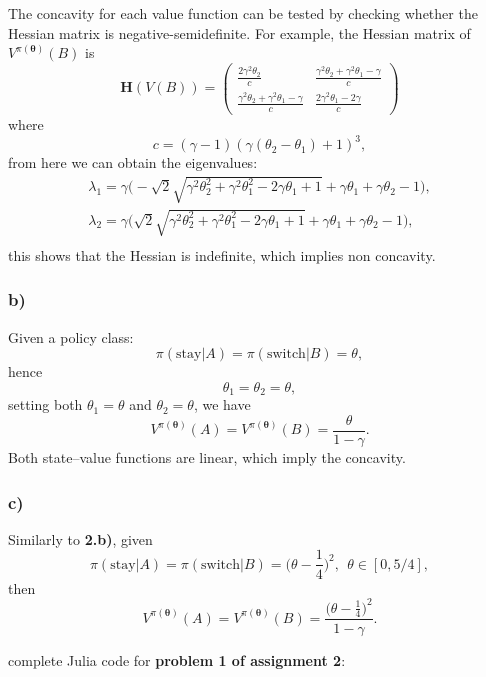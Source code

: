 \documentclass[12pt]{article}
\begin{document}
The concavity for each value function can be tested by checking whether the Hessian matrix is negative-semidefinite.
For example, the Hessian matrix of $V^{\pi(\boldsymbol{\theta})}(B)$ is
\begin{equation*}
    \mathbf{H}(V(B)) = 
    \begin{pmatrix}
        \frac{2\gamma^2\theta_2}{c} & \frac{\gamma^2\theta_2+\gamma^2\theta_1-\gamma}{c} \\
        \frac{\gamma^2\theta_2+\gamma^2\theta_1-\gamma}{c} & \frac{2\gamma^2\theta_1 - 2\gamma}{c}
    \end{pmatrix}
\end{equation*}
where 
\begin{equation*}
    c = (\gamma-1)(\gamma(\theta_2 - \theta_1)+1)^3,
\end{equation*}
from here we can obtain the eigenvalues:
\begin{equation*}
    \begin{split}
        \lambda_1 = \gamma\Big(-\sqrt{2}\sqrt{\gamma^2\theta_2^2 + \gamma^2\theta_1^2 - 2\gamma\theta_1 + 1} + \gamma\theta_1 + \gamma\theta_2 - 1\Big), \\
        \lambda_2 = \gamma\Big(\sqrt{2}\sqrt{\gamma^2\theta_2^2 + \gamma^2\theta_1^2 - 2\gamma\theta_1 + 1} + \gamma\theta_1 + \gamma\theta_2 - 1\Big), \\
    \end{split}
\end{equation*}
this shows that the Hessian is indefinite, which implies non concavity.
\subsubsection*{b)}
Given a policy class:
\begin{equation}
    \pi(\text{stay}|A) = \pi(\text{switch}|B) = \theta,
\end{equation}
hence
\begin{equation*}
    \theta_1 = \theta_2 = \theta,
\end{equation*}
setting both $\theta_1 = \theta$ and $\theta_2 = \theta$, we have
\begin{equation*}
    V^{\pi(\boldsymbol\theta)}(A) = V^{\pi(\boldsymbol\theta)}(B) = \frac{\theta}{1-\gamma}.
\end{equation*}
Both state--value functions are linear, which imply the concavity.
\subsubsection*{c)}
Similarly to \textbf{2.b)}, given
\begin{equation*}
    \pi(\text{stay}|A) = \pi(\text{switch}|B) = \Big(\theta - \frac{1}{4}\Big)^2, ~~ \theta \in [0, 5/4],
\end{equation*}
then
\begin{equation*}
    V^{\pi(\boldsymbol\theta)}(A) = V^{\pi(\boldsymbol\theta)}(B) = \frac{\Big(\theta - \frac{1}{4}\Big)^2}{1-\gamma}.
\end{equation*}

\newpage
\begin{appendices}
    complete Julia code for \textbf{problem 1 of assignment 2}:
\end{appendices}
\end{document}
